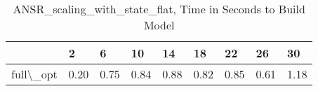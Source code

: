 \begin{table}
\centering
\caption{ANSR\_scaling\_with\_state\_flat, Time in Seconds to Build Model}
\label{ANSR_scaling_with_state_flat_model_time}
\begin{tabular}{lllllllll}
\toprule
{} &     2 &     6 &    10 &    14 &    18 &    22 &    26 &    30 \\
\midrule
full\textbackslash \_opt &  0.20 &  0.75 &  0.84 &  0.88 &  0.82 &  0.85 &  0.61 &  1.18 \\
\bottomrule
\end{tabular}
\end{table}
